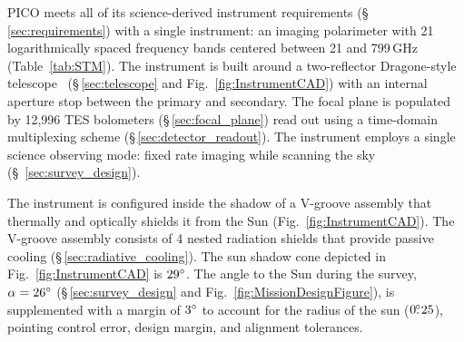
PICO meets all of its science-derived instrument requirements (\S\,\ref{sec:requirements}) with a single instrument: an imaging polarimeter with 21 logarithmically spaced frequency bands centered between 21 and 799\,GHz (Table~\ref{tab:STM}). The instrument is built around a two-reflector Dragone-style telescope~\citep{open_dragone} (\S\,\ref{sec:telescope} and Fig.~\ref{fig:InstrumentCAD}) with an internal aperture stop between the primary and secondary. The focal plane is populated by 12,996 \ac{TES} bolometers (\S\,\ref{sec:focal_plane}) read out using a time-domain multiplexing scheme (\S\,\ref{sec:detector_readout}). The instrument employs a single science observing mode: fixed rate imaging while scanning the sky (\S~\ref{sec:survey_design}).

The instrument is configured inside the shadow of a V-groove assembly that thermally and optically shields it from the Sun (Fig.~\ref{fig:InstrumentCAD}). The V-groove assembly consists of 4 nested radiation shields that provide passive cooling (\S\,\ref{sec:radiative_cooling}). The sun shadow cone depicted in Fig.~\ref{fig:InstrumentCAD} is $29^\circ$. The angle to the Sun during the survey, $\alpha = 26^\circ$ (\S\,\ref{sec:survey_design} and Fig.~\ref{fig:MissionDesignFigure}), is supplemented with a margin of $3^\circ$ to account for the radius of the sun ($0.\!\!^\circ25$), pointing control error, design margin, and alignment tolerances.

